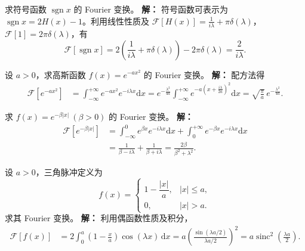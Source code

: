 \begin{tcolorbox}[title=例 5：符号函数, colframe=orange!75!black, colback=orange!5!white, sharp corners]
  求符号函数 $\operatorname{sgn} x$ 的 Fourier 变换。
  \tcbline
  \textbf{解：} 符号函数可表示为 $\operatorname{sgn} x = 2H(x)-1$。利用线性性质及
  $\mathcal{F}[H(x)]=\frac{1}{i\lambda}+\pi\delta(\lambda)$，$\mathcal{F}[1]=2\pi\delta(\lambda)$，有
  \[
  \mathcal{F}[\operatorname{sgn} x]=2\left(\frac{1}{i\lambda}+\pi\delta(\lambda)\right)-2\pi\delta(\lambda)=\frac{2}{i\lambda}.
  \]
\end{tcolorbox}

\begin{tcolorbox}[title=例 6：高斯函数, colframe=orange!75!black, colback=orange!5!white, sharp corners]
  设 $a>0$，求高斯函数 $f(x)=e^{-ax^2}$ 的 Fourier 变换。
  \tcbline
  \textbf{解：} 配方法得
  \[
  \begin{aligned}
    \mathcal{F}[e^{-ax^2}]&=\int_{-\infty}^{+\infty} e^{-ax^2} e^{-i\lambda x}\mathrm{d}x
    =e^{-\frac{\lambda^2}{4a}}\int_{-\infty}^{+\infty} e^{-a\left(x+\frac{i\lambda}{2a}\right)^2}\mathrm{d}x
    =\sqrt{\frac{\pi}{a}}\, e^{-\frac{\lambda^2}{4a}}.
  \end{aligned}
  \]
\end{tcolorbox}

\begin{tcolorbox}[title=例 7：双边指数函数, colframe=orange!75!black, colback=orange!5!white, sharp corners]
  求 $f(x)=e^{-\beta|x|}\ (\beta>0)$ 的 Fourier 变换。
  \tcbline
  \textbf{解：} 
  \[
  \begin{aligned}
    \mathcal{F}[e^{-\beta|x|}]
    &=\int_{-\infty}^{0} e^{\beta x} e^{-i\lambda x}\mathrm{d}x + \int_{0}^{+\infty} e^{-\beta x} e^{-i\lambda x}\mathrm{d}x\\
    &=\frac{1}{\beta-i\lambda} + \frac{1}{\beta+i\lambda}
    = \frac{2\beta}{\beta^2+\lambda^2}.
  \end{aligned}
  \]
\end{tcolorbox}

\begin{tcolorbox}[title=例 8：三角脉冲, colframe=orange!75!black, colback=orange!5!white, sharp corners]
  设 $a>0$，三角脉冲定义为
  \[
  f(x)=\begin{cases}
    1-\dfrac{|x|}{a}, & |x|\le a,\\
    0, & |x|>a.
  \end{cases}
  \]
  求其 Fourier 变换。
  \tcbline
  \textbf{解：} 利用偶函数性质及积分，
  \[
  \begin{aligned}
    \mathcal{F}[f(x)]&=2\int_{0}^{a} \left(1-\frac{x}{a}\right)\cos(\lambda x)\,\mathrm{d}x
    = a\left(\frac{\sin(\lambda a/2)}{\lambda a/2}\right)^2
    = a\operatorname{sinc}^2\!\left(\frac{\lambda a}{2}\right).
  \end{aligned}
  \]
\end{tcolorbox}

